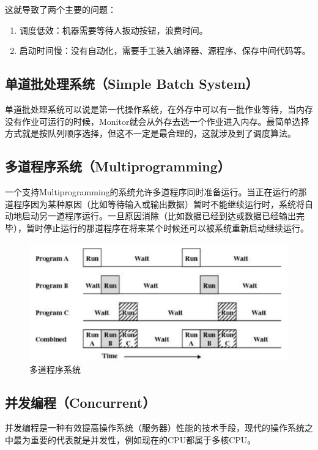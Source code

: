这就导致了两个主要的问题：

\begin{enumerate}
	\item 调度低效：机器需要等待人扳动按钮，浪费时间。
	\item 启动时间慢：没有自动化，需要手工装入编译器、源程序、保存中间代码等。
\end{enumerate}

\subsection{单道批处理系统（Simple Batch System）}

单道批处理系统可以说是第一代操作系统，在外存中可以有一批作业等待，当内存没有作业可运行的时候，Monitor就会从外存去选一个作业进入内存。最简单选择方式就是按队列顺序选择，但这不一定是最合理的，这就涉及到了调度算法。

\subsection{多道程序系统（Multiprogramming）}

一个支持Multiprogramming的系统允许多道程序同时准备运行。当正在运行的那道程序因为某种原因（比如等待输入或输出数据）暂时不能继续运行时，系统将自动地启动另一道程序运行。一旦原因消除（比如数据已经到达或数据已经输出完毕），暂时停止运行的那道程序在将来某个时候还可以被系统重新启动继续运行。

\begin{figure}[H]
	\centering
	\includegraphics[]{img/C1/1-6/2.png}
	\caption{多道程序系统}
\end{figure}

\subsection{并发编程（Concurrent）}

并发编程是一种有效提高操作系统（服务器）性能的技术手段，现代的操作系统之中最为重要的代表就是并发性，例如现在的CPU都属于多核CPU。 \\

